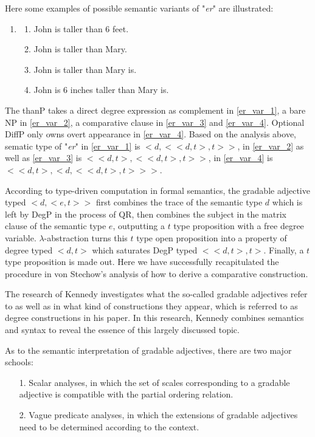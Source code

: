 \documentclass{ctexart}
\let \cite \parencite
\begin{document}
Here some examples of possible semantic variants of "\textit{er}" are illustrated:

\begin{enumerate}[resume]
    \item
    \begin{enumerate}[ref=(\arabic{enumi}\alph*)]
        \item \label{er_var_1} John is taller than 6 feet.
        \item \label{er_var_2} John is taller than Mary.
        \item \label{er_var_3} John is taller than Mary is.
        \item \label{er_var_4} John is 6 inches taller than Mary is.
    \end{enumerate}

\end{enumerate}

The thanP takes a direct degree expression as complement in \ref{er_var_1}, a bare NP in \ref{er_var_2}, a comparative clause in \ref{er_var_3} and \ref{er_var_4}. Optional DiffP only owns overt appearance in \ref{er_var_4}. Based on the analysis above, sematic type of "\textit{er}" in \ref{er_var_1} is $<d,<<d,t>,t>>$, in \ref{er_var_2} as well as \ref{er_var_3} is $<<d,t>,<<d,t>,t>>$, in \ref{er_var_4} is $<<d,t>,<d,<<d,t>,t>>>$.

According to type-driven computation in formal semantics, the gradable adjective typed $<d,<e,t>>$ first combines the trace of the semantic type $d$ which is left by DegP in the process of QR, then combines the subject in the matrix clause of the semantic type $e$, outputting a $t$ type proposition with a free degree variable. $\lambda$-abstraction turns this $t$ type open proposition into a property of degree typed $<d,t>$ which saturates DegP typed $<<d,t>,t>$. Finally, a $t$ type proposition is made out. Here we have successfully recapitulated the procedure in von Stechow’s analysis of how to derive a comparative construction.

The research of Kennedy investigates what the so-called gradable adjectives refer to as well as in what kind of constructions they appear, which is referred to as degree constructions in his paper\cite{kennedy1997}. In this research, Kennedy combines semantics and syntax to reveal the essence of this largely discussed topic.

As to the semantic interpretation of gradable adjectives, there are two major schools:

\begin{itemize}
    \item[1.] Scalar analyses, in which the set of scales corresponding to a gradable adjective is compatible with the partial ordering relation\cite{cresswell1976,bierwisch1989}.
    \item[2.] Vague predicate analyses, in which the extensions of gradable adjectives need to be determined according to the context\cite{ginet1973,kamp2013,klein1980}. 
\end{itemize}
\end{document}
